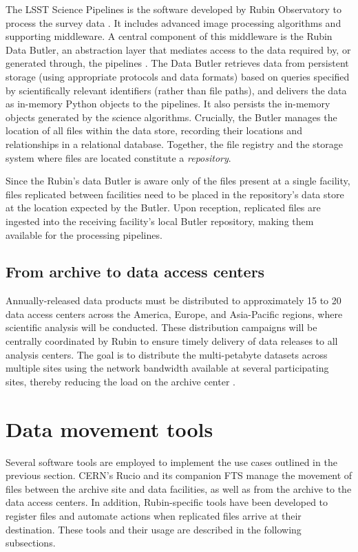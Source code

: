 \documentclass{webofc}
\begin{document}
The LSST Science Pipelines is the software developed by Rubin Observatory to process the survey data \cite{bosch-pipelines}. It includes advanced image processing algorithms and supporting middleware. A central component of this middleware is the Rubin Data Butler, an abstraction layer that mediates access to the data required by, or generated through, the pipelines \cite{2022SPIE12189E..11J}. The Data Butler retrieves data from persistent storage (using appropriate protocols and data formats) based on queries specified by scientifically relevant identifiers (rather than file paths), and delivers the data as in-memory Python objects to the pipelines. It also persists the in-memory objects generated by the science algorithms. Crucially, the Butler manages the location of all files within the data store, recording their locations and relationships in a relational database. Together, the file registry and the storage system where files are located constitute a \emph{repository}.

Since the Rubin's data Butler is aware only of the files present at a single facility, files replicated between facilities need to be placed in the repository’s data store at the location expected by the Butler. Upon reception, replicated files are ingested into the receiving facility’s local Butler repository, making them available for the processing pipelines.


\subsection{From archive to data access centers}
\label{summit-to-data-access-centers}

Annually-released data products must be distributed to approximately 15 to 20 data access centers across the America, Europe, and Asia-Pacific regions, where scientific analysis will be conducted. These distribution campaigns will be centrally coordinated by Rubin to ensure timely delivery of data releases to all analysis centers. The goal is to distribute the multi-petabyte datasets across multiple sites using the network bandwidth available at several participating sites, thereby reducing the load on the archive center \cite{RTN-086}.

\section{Data movement tools}
\label{section-data-movement-tools}

Several software tools are employed to implement the use cases outlined in the previous section. CERN's Rucio \cite{rucio2019} and its companion FTS \cite{FTS} manage the movement of files between the archive site and data facilities, as well as from the archive to the data access centers. In addition, Rubin-specific tools have been developed to register files and automate actions when replicated files arrive at their destination. These tools and their usage are described in the following subsections.
\end{document}
